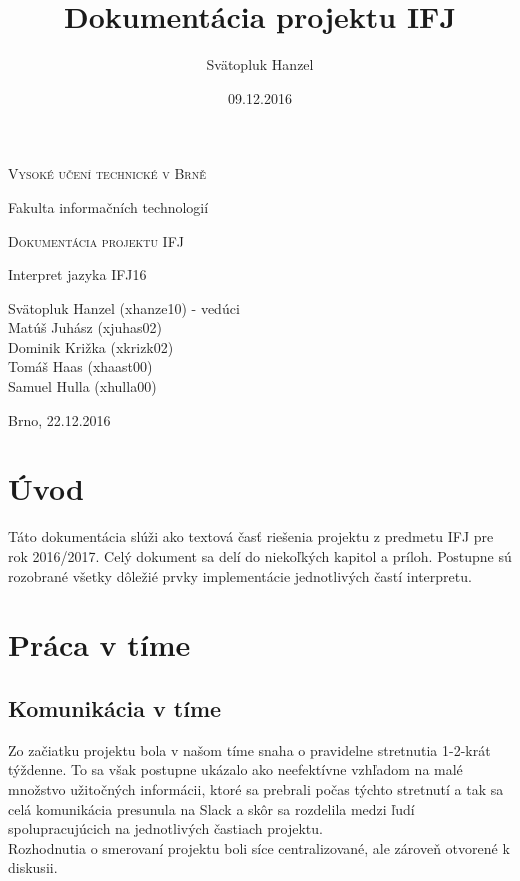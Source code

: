 \documentclass[12pt]{article}
\title{Dokumentácia projektu IFJ}
\author{Svätopluk Hanzel}
\date{09.12.2016}
\begin{document}
	\begin{titlepage}
		\begin{center}
		{\scshape\LARGE Vysoké učení technické v Brně \par}
		{\Large Fakulta informačních technologií\par}


		\vspace{3cm}

		{\scshape\LARGE Dokumentácia projektu IFJ\par}
		{\Large Interpret jazyka IFJ16 \par}


		\vfill

		Svätopluk Hanzel (xhanze10) - vedúci\\
		Matúš Juhász (xjuhas02)\\
		Dominik Križka (xkrizk02)\\
		Tomáš Haas (xhaast00)\\
		Samuel Hulla (xhulla00)\\
		\vspace{1cm}

		{\hfill Brno, 22.12.2016}
	\end{center}
	\end{titlepage}
	\tableofcontents{}
	\newpage

	\section{Úvod}
		Táto dokumentácia slúži ako textová časť riešenia projektu z predmetu IFJ pre rok 2016/2017. Celý dokument sa delí do niekoľkých kapitol a príloh. Postupne sú rozobrané všetky dôležié prvky implementácie jednotlivých častí interpretu.
	\section{Práca v tíme}
        \subsection{Komunikácia v tíme}
	        Zo začiatku projektu bola v našom tíme snaha o pravidelne stretnutia 1-2-krát týždenne. To sa však postupne ukázalo ako neefektívne vzhľadom na malé množstvo užitočných informácii, ktoré sa prebrali počas týchto stretnutí a tak sa celá komunikácia presunula na Slack a skôr sa rozdelila medzi ľudí spolupracujúcich na jednotlivých častiach projektu.\\
	        Rozhodnutia o smerovaní projektu boli síce centralizované, ale zároveň otvorené k diskusii.
\end{document}
